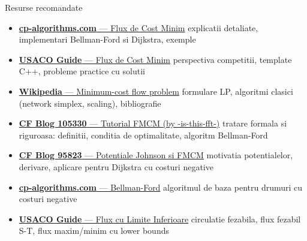 ﻿\documentclass[9pt]{beamer}
\begin{document}
\begin{frame}{Resurse recomandate}
  \begin{itemize}
    \footnotesize
    \item \href{https://cp-algorithms.com/graph/min_cost_flow.html}{\textbf{cp-algorithms.com} --- Flux de Cost Minim}
          \textemdash{} explicatii detaliate, implementari Bellman-Ford si Dijkstra, exemple
    \smallskip
    \item \href{https://usaco.guide/adv/min-cost-flow?lang=cpp}{\textbf{USACO Guide} --- Flux de Cost Minim}
          \textemdash{} perspectiva competitii, template C++, probleme practice cu solutii
    \smallskip
    \item \href{https://en.wikipedia.org/wiki/Minimum-cost_flow_problem}{\textbf{Wikipedia} --- Minimum-cost flow problem}
          \textemdash{} formulare LP, algoritmi clasici (network simplex, scaling), bibliografie
    \smallskip
    \item \href{https://codeforces.com/blog/entry/105330}{\textbf{CF Blog 105330} --- Tutorial FMCM (by -is-this-fft-)}
          \textemdash{} tratare formala si riguroasa: definitii, conditia de optimalitate, algoritm Bellman-Ford
    \smallskip
    \item \href{https://codeforces.com/blog/entry/95823}{\textbf{CF Blog 95823} --- Potentiale Johnson si FMCM}
          \textemdash{} motivatia potentialelor, derivare, aplicare pentru Dijkstra cu costuri negative
    \smallskip
    \item \href{https://cp-algorithms.com/graph/bellman_ford.html}{\textbf{cp-algorithms.com} --- Bellman-Ford}
          \textemdash{} algoritmul de baza pentru drumuri cu costuri negative
    \smallskip
    \item \href{https://usaco.guide/adv/flow-lb?lang=cpp}{\textbf{USACO Guide} --- Flux cu Limite Inferioare}
          \textemdash{} circulatie fezabila, flux fezabil S-T, flux maxim/minim cu lower bounds
  \end{itemize}
\end{frame}
\end{document}
